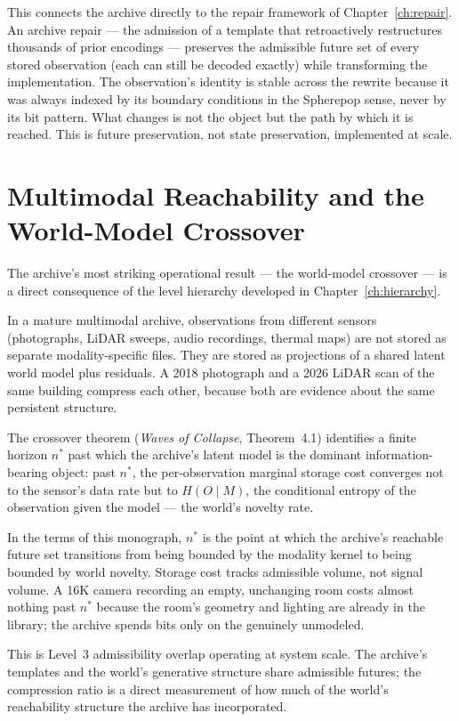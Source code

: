 \documentclass[11pt, a4paper, openany]{book}
\theoremstyle{plain}
\theoremstyle{definition}
\theoremstyle{remark}
\begin{document}
This connects the archive directly to the repair framework of Chapter~\ref{ch:repair}.
An archive repair --- the admission of a template that retroactively restructures
thousands of prior encodings --- preserves the admissible future set of every
stored observation (each can still be decoded exactly) while transforming
the implementation.
The observation's identity is stable across the rewrite because it was always
indexed by its boundary conditions in the Spherepop sense, never by its bit pattern.
What changes is not the object but the path by which it is reached.
This is future preservation, not state preservation, implemented at scale.

\section{Multimodal Reachability and the World-Model Crossover}

The archive's most striking operational result --- the world-model crossover ---
is a direct consequence of the level hierarchy developed in Chapter~\ref{ch:hierarchy}.

In a mature multimodal archive, observations from different sensors
(photographs, LiDAR sweeps, audio recordings, thermal maps) are not stored
as separate modality-specific files.
They are stored as projections of a shared latent world model plus residuals.
A 2018 photograph and a 2026 LiDAR scan of the same building compress each other,
because both are evidence about the same persistent structure.

The crossover theorem (\emph{Waves of Collapse}, Theorem~4.1) identifies
a finite horizon $n^*$ past which the archive's latent model is the dominant
information-bearing object:
past $n^*$, the per-observation marginal storage cost converges not to the
sensor's data rate but to $H(O \mid M)$, the conditional entropy of the
observation given the model --- the world's novelty rate.

In the terms of this monograph, $n^*$ is the point at which the archive's
reachable future set transitions from being bounded by the modality kernel
to being bounded by world novelty.
Storage cost tracks admissible volume, not signal volume.
A 16K camera recording an empty, unchanging room costs almost nothing past $n^*$
because the room's geometry and lighting are already in the library;
the archive spends bits only on the genuinely unmodeled.

This is Level~3 admissibility overlap operating at system scale.
The archive's templates and the world's generative structure share admissible futures;
the compression ratio is a direct measurement of how much of the world's reachability
structure the archive has incorporated.
\end{document}
